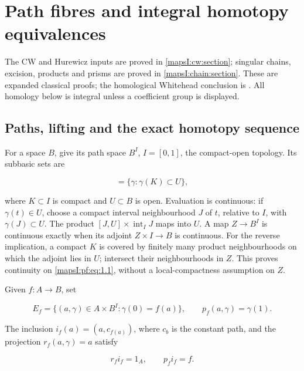 \section{Path fibres and integral homotopy equivalences}
\label{mapsI:pf:section}

The CW and Hurewicz inputs are proved in \cref{mapsI:cw:section}; singular chains, excision, products and prisms are proved in \cref{mapsI:chain:section}. These are expanded classical proofs; the homological Whitehead conclusion is \cite[Corollary~4.33]{Hatcher2002}. All homology below is integral unless a coefficient group is displayed.

\subsection{Paths, lifting and the exact homotopy sequence}
\label{mapsI:pf:path-lifting}

For a space \(B\), give its path space \(B^I\), \(I=[0,1]\), the compact-open topology. Its subbasic sets are

\begin{equation}
[K,U]=\{\gamma:\gamma(K)\subset U\},
\label{mapsI:pf:eq:1.1}
\end{equation}

where \(K\subset I\) is compact and \(U\subset B\) is open. Evaluation is continuous: if \(\gamma(t)\in U\), choose a compact interval neighbourhood \(J\) of \(t\), relative to \(I\), with \(\gamma(J)\subset U\). The product \([J,U]\times\operatorname{int}_I J\) maps into \(U\). A map \(Z\to B^I\) is continuous exactly when its adjoint \(Z\times I\to B\) is continuous. For the reverse implication, a compact \(K\) is covered by finitely many product neighbourhoods on which the adjoint lies in \(U\); intersect their neighbourhoods in \(Z\). This proves continuity on \eqref{mapsI:pf:eq:1.1}, without a local-compactness assumption on \(Z\).

Given \(f:A\to B\), set

\begin{equation}
E_f=\{(a,\gamma)\in A\times B^I:\gamma(0)=f(a)\},\qquad
p_f(a,\gamma)=\gamma(1).
\label{mapsI:pf:eq:1.2}
\end{equation}

The inclusion \(i_f(a)=(a,c_{f(a)})\), where \(c_b\) is the constant path, and the projection \(r_f(a,\gamma)=a\) satisfy

\begin{equation}
r_fi_f=1_A,\qquad p_fi_f=f.
\label{mapsI:pf:eq:1.3}
\end{equation}

